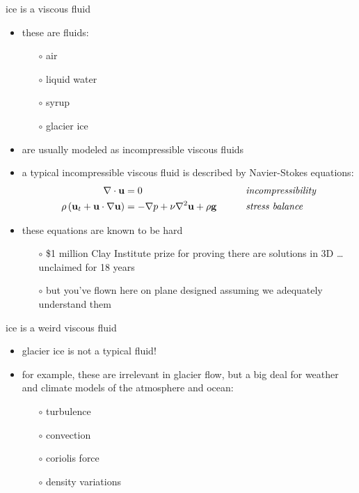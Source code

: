 \documentclass[hide notes,intlimits]{beamer}
\begin{document}
\begin{frame}{ice is a viscous fluid}

\begin{itemize}
\item these are fluids:
  \begin{itemize}
  \item[$\circ$] air
  \item[$\circ$] liquid water
  \item[$\circ$] syrup
  \item[$\circ$] glacier ice
  \end{itemize}
\item are usually modeled as \alert{incompressible viscous fluids}
\item a typical incompressible viscous fluid is described by Navier-Stokes equations:
\begin{align*}
\nabla \cdot \mathbf{u} &= 0 &&\qquad \text{\emph{incompressibility}} \\
\rho \left(\mathbf{u}_t + \mathbf{u}\cdot\nabla \mathbf{u}\right) &= -\nabla p + \nu \nabla^2 \mathbf{u} + \rho \mathbf{g} &&\qquad \text{\emph{stress balance}}
\end{align*}

\small
\item these equations are known to be hard
  \begin{itemize}
  \item[$\circ$] \$1 million Clay Institute prize for proving there are solutions in 3D \dots unclaimed for 18 years
  \item[$\circ$] but you've flown here on plane designed assuming we adequately understand them
  \end{itemize}
\end{itemize}
\end{frame}


\begin{frame}{ice is a weird viscous fluid}

\begin{itemize}
\item glacier ice is not a typical fluid!
\item for example, these are \alert{irrelevant in glacier flow}, but a big deal for weather and climate models of the atmosphere and ocean:
  \begin{itemize}
  \item[$\circ$] turbulence
  \item[$\circ$] convection
  \item[$\circ$] coriolis force
  \item[$\circ$] density variations
  \end{itemize}
\end{itemize}
\end{frame}
\end{document}

